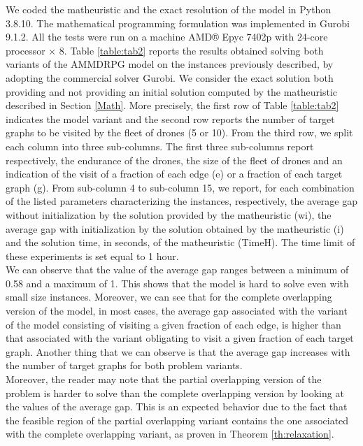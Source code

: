 \documentclass[10pt,a4paper]{elsarticle}
\def\AMD{{\sf AMMDRPG\xspace}}
\newcommand{\EN}[1]{{\color{black}#1}}
\begin{document}
\noindent
We coded the matheuristic and the exact resolution of the model in Python 3.8.10. The mathematical programming formulation \EN{was} implemented in Gurobi 9.1.2. All the tests \EN{were} run on a machine AMD® Epyc 7402p with 24-core processor × 8.
Table \ref{table:tab2} reports the results obtained solving both variants of the \AMD\xspace model on the instances previously described, by adopting the commercial solver Gurobi. We consider the exact solution both providing and not providing an initial solution computed by the matheuristic described in Section \ref{Math}. More precisely, the first row of Table \ref{table:tab2} indicates the model variant and the second row reports the number of target graphs to be visited by the fleet of drones (5 or 10). From the third row, we split each column in\EN{to} three sub-columns. The first three sub-columns report respectively, the endurance of the drones, the size of the fleet of drones and \EN{an} indication \EN{of} the visit of a fraction of each edge (e) or a fraction of each target graph (g). From sub-column 4 to sub-column 15, we report, for each combination of the listed parameters characterizing the instances, respectively, the average gap without initialization by the solution provided by the matheuristic (wi), the average gap with initialization by the solution obtained by the matheuristic (i) and the solution time, in seconds, of the matheuristic (TimeH). The time limit of these experiments is set equal to 1 hour.\\
\noindent
We can observe that the value of the average gap ranges between a minimum of 0.58 and a maximum of 1. This shows that the model is hard \EN{to solve} even with small size instances. Moreover, we can see that for the complete overlapping version of the model, in most cases, the average gap associated with the variant of the model consisting \EN{of} visiting a given fraction of each edge, is higher than \EN{that} associated with the variant \EN{obligating} to visit a given fraction of each target graph. 
Another thing that we can observe is that the average gap increases with the number of target graphs for both problem variants.\\
\noindent
Moreover, the reader may note that the partial overlapping version of the problem is harder to solve than the complete overlapping version by looking at the values of the average gap. This is an expected \EN{behavior} due to the fact that the feasible region of the partial overlapping variant contains the one associated with the complete overlapping variant, as proven in Theorem \ref{th:relaxation}. 
\end{document}
